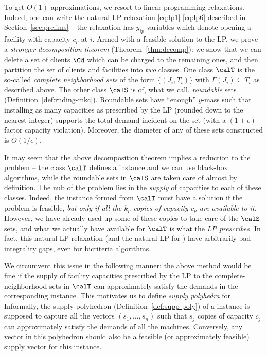 \medskip {} %
To get $O(1)$-approximations, we resort to linear programming relaxations. Indeed, one can write the natural LP relaxation \eqref{eq:lp1}-\eqref{eq:lp6} described in Section~\ref{sec:prelims} -- the relaxation has $y_{ip}$ variables which denote opening a
facility with capacity $c_p$ at $i$.
Armed with a feasible solution to the LP, we prove a \emph{stronger decomposition theorem} (Theorem~\ref{thm:decomp}): we show that we can delete a set of clients $\Cd$ which can be charged to the remaining ones, and then partition the set of clients and facilities into {\em two} classes.
One class $\calT$  is the so-called \emph{complete neighborhood sets} of the form $\{(J_i, T_i)\}$ with $\Gamma(J_i) \subseteq T_i$ as described above. The other class $\calS$  is of, what we call, {\em roundable} sets (Definition~\ref{def:rnding-mkc}). Roundable sets have ``enough'' $y$-mass such that installing as many  capacities as prescribed by the LP (rounded down to the nearest integer) supports the total demand incident on the set (with a $(1+\epsilon)$-factor capacity violation). Moreover, the diameter of any of these sets constructed is $\tilde{O}(1/\epsilon)$.

\medskip {}
It may seem that the above decomposition theorem implies a reduction to the \cckp problem -- the class $\calT$ defines a \cckp instance and we can use black-box algorithms, while the roundable sets in $\calS$ are taken care of almost by definition. The nub of the problem lies in the {\em supply} of capacities to each of these classes.  Indeed, the \cckp instance formed from $\calT$ must have a solution if the \mckc problem is feasible, {\em but only if all the $k_p$ copies of capacity $c_p$ are available to it.} However, we have already used up some of these copies to take care of the $\calS$ sets, and what we actually have available for $\calT$ is what the {\em LP prescribes.} In fact, this natural LP relaxation (and the natural LP for \cckp) have arbitrarily bad integrality gaps, even for bicriteria algorithms.%

\medskip {} We circumvent this issue in the following manner: the above method would be fine if the supply of facility capacities prescribed by the LP to the complete-neighborhood sets in $\calT$ can approximately satisfy the demands in the corresponding \cckp instance. This motivates us to define {\em supply polyhedra} for \cckp. Informally, the supply polyhedron (Definition~\ref{def:supp-poly}) of a \cckp instance is supposed to capture all the vectors $(s_1,\ldots,s_n)$ such that $s_j$ copies of capacity $c_j$ can approximately satisfy the demands of all the machines. Conversely, any vector in this polyhedron should also be a feasible (or approximately feasible) supply vector for this instance.

